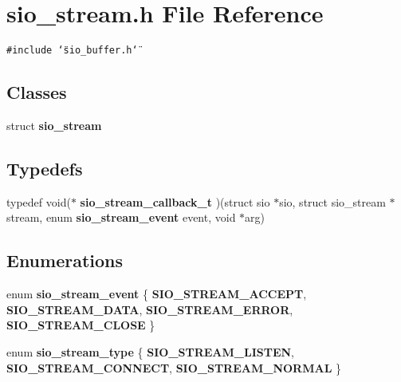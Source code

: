 \section{sio\_\-stream.h File Reference}
\label{sio__stream_8h}
{\tt \#include \char`\"{}sio\_\-buffer.h\char`\"{}}\par
\subsection*{Classes}
\begin{CompactItemize}
\item 
struct {\bf sio\_\-stream}
\end{CompactItemize}
\subsection*{Typedefs}
\begin{CompactItemize}
\item 
typedef void($\ast$ {\bf sio\_\-stream\_\-callback\_\-t} )(struct sio $\ast$sio, struct sio\_\-stream $\ast$stream, enum {\bf sio\_\-stream\_\-event} event, void $\ast$arg)\label{sio__stream_8h_a0}

\end{CompactItemize}
\subsection*{Enumerations}
\begin{CompactItemize}
\item 
enum {\bf sio\_\-stream\_\-event} \{ {\bf SIO\_\-STREAM\_\-ACCEPT}, 
{\bf SIO\_\-STREAM\_\-DATA}, 
{\bf SIO\_\-STREAM\_\-ERROR}, 
{\bf SIO\_\-STREAM\_\-CLOSE}
 \}
\item 
enum {\bf sio\_\-stream\_\-type} \{ {\bf SIO\_\-STREAM\_\-LISTEN}, 
{\bf SIO\_\-STREAM\_\-CONNECT}, 
{\bf SIO\_\-STREAM\_\-NORMAL}
 \}
\end{CompactItemize}
